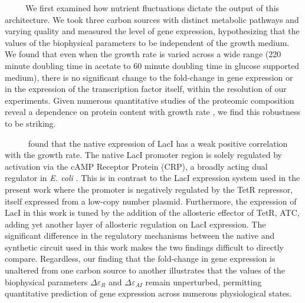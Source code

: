\documentclass[12pt]{caltech_thesis}
\begin{document}
~~~~~We first examined how nutrient fluctuations dictate the output of
this architecture. We took three carbon sources with distinct metabolic
pathways and varying quality and measured the level of gene expression,
hypothesizing that the values of the biophysical parameters to be
independent of the growth medium. We found that even when the growth
rate is varied across a wide range (220 minute doubling time in acetate
to 60 minute doubling time in glucose supported medium), there is no
significant change to the fold-change in gene expression or in the
expression of the transcription factor itself, within the resolution of
our experiments. Given numerous quantitative studies of the proteomic
composition reveal a dependence on protein content with growth rate
\autocite{hui2015,schmidt2016,li2014}, we find this robustness to be
striking.

~~~~~\textcite{schmidt2016} found that the native expression of LacI has
a weak positive correlation with the growth rate. The native LacI
promoter region is solely regulated by activation via the cAMP Receptor
Protein (CRP), a broadly acting dual regulator in \emph{E. coli}
\autocite{gama-castro2016}. This is in contrast to the LacI expression
system used in the present work where the promoter is negatively
regulated by the TetR repressor, itself expressed from a low-copy number
plasmid. Furthermore, the expression of LacI in this work is tuned by
the addition of the allosteric effector of TetR, ATC, adding yet another
layer of allosteric regulation on LacI expression. The significant
difference in the regulatory mechanisms between the native and synthetic
circuit used in this work makes the two findings difficult to directly
compare. Regardless, our finding that the fold-change in gene expression
is unaltered from one carbon source to another illustrates that the
values of the biophysical parameters \(\Delta\varepsilon_ {R}\) and
\(\Delta\varepsilon_{AI}\) remain unperturbed, permitting quantitative
prediction of gene expression across numerous physiological states.
\end{document}
